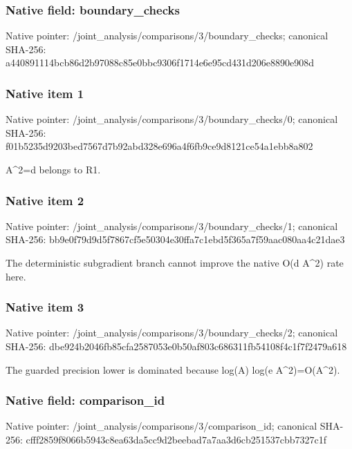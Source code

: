 \documentclass[10pt,a4paper]{article}
\begin{document}
\subsubsection{Native field: boundary\_\allowbreak{}checks}
Native pointer: /joint\_\allowbreak{}analysis/comparisons/3/boundary\_\allowbreak{}checks; canonical SHA-256: a440891114bcb86d2b97088c85e0bbc9306f1714e6e95cd431d206e8890e908d

\subsubsection{Native item 1}
Native pointer: /joint\_\allowbreak{}analysis/comparisons/3/boundary\_\allowbreak{}checks/0; canonical SHA-256: f01b5235d9203bed7567d7b92abd328e696a4f6fb9ce9d8121ce54a1ebb8a802

\begingroup\raggedright\sloppy A\textasciicircum{}2=\allowbreak{}d belongs to R1.\par\endgroup

\subsubsection{Native item 2}
Native pointer: /joint\_\allowbreak{}analysis/comparisons/3/boundary\_\allowbreak{}checks/1; canonical SHA-256: bb9e0f79d9d5f7867cf5e50304e30ffa7c1ebd5f365a7f59aac080aa4c21dae3

\begingroup\raggedright\sloppy The deterministic subgradient branch cannot improve the native O(d A\textasciicircum{}2) rate here.\par\endgroup

\subsubsection{Native item 3}
Native pointer: /joint\_\allowbreak{}analysis/comparisons/3/boundary\_\allowbreak{}checks/2; canonical SHA-256: dbe924b2046fb85cfa2587053e0b50af803c686311fb54108f4c1f7f2479a618

\begingroup\raggedright\sloppy The guarded precision lower is dominated because log(A) log(e A\textasciicircum{}2)=\allowbreak{}O(A\textasciicircum{}2).\par\endgroup

\subsubsection{Native field: comparison\_\allowbreak{}id}
Native pointer: /joint\_\allowbreak{}analysis/comparisons/3/comparison\_\allowbreak{}id; canonical SHA-256: cfff2859f8066b5943c8ea63da5cc9d2beebad7a7aa3d6cb251537cbb7327c1f
\end{document}
